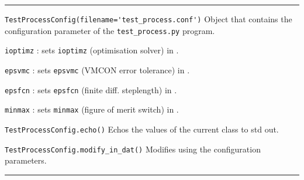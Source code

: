 \rule{\textwidth}{0.4pt}

\begin{description}

\item{\verb|TestProcessConfig(filename='test_process.conf')|} Object that
  contains the configuration parameter of the \verb|test_process.py| program.

  \verb|ioptimz| : sets \verb|ioptimz| (optimisation solver) in \indat.

  \verb|epsvmc| : sets \verb|epsvmc| (VMCON error tolerance) in \indat.

  \verb|epsfcn| : sets \verb|epsfcn| (finite diff. steplength) in \indat.

  \verb|minmax| : sets \verb|minmax| (figure of merit switch) in \indat.

\item{\verb|TestProcessConfig.echo()|} Echos the values of the current class
  to std out.

\item{\verb|TestProcessConfig.modify_in_dat()|} Modifies \indat\/ using the
  configuration parameters.

\end{description}

\rule{\textwidth}{0.4pt}


